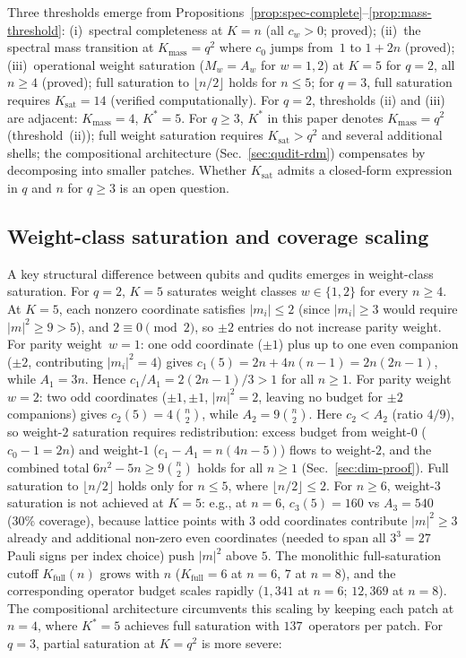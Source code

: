 \documentclass[twocolumn,prx,aps,superscriptaddress,longbibliography]{revtex4-2}
\begin{document}
Three thresholds emerge from
Propositions~\ref{prop:spec-complete}--\ref{prop:mass-threshold}:
(i)~spectral completeness at $K = n$ (all $c_w > 0$; proved);
(ii)~the spectral mass transition at $K_{\mathrm{mass}} = q^2$
where $c_0$ jumps from~$1$ to $1 + 2n$ (proved);
(iii)~operational weight saturation ($M_w = A_w$ for
$w = 1, 2$) at $K = 5$ for $q = 2$, all $n \ge 4$ (proved);
full saturation to $\lfloor n/2 \rfloor$ holds for $n \le 5$;
for $q = 3$, full saturation requires
$K_\mathrm{sat} = 14$ (verified computationally).
For $q = 2$, thresholds (ii) and (iii) are adjacent:
$K_{\mathrm{mass}} = 4$, $K^* = 5$.
For $q \ge 3$, $K^*$ in this paper denotes
$K_{\mathrm{mass}} = q^2$ (threshold~(ii)); full weight saturation
requires $K_{\mathrm{sat}} > q^2$ and several additional shells;
the compositional architecture (Sec.~\ref{sec:qudit-rdm})
compensates by decomposing into smaller patches.
Whether $K_\mathrm{sat}$ admits a closed-form expression in
$q$ and $n$ for $q \ge 3$ is an open question.

\subsection{Weight-class saturation and coverage scaling}
\label{sec:saturation}

A key structural difference between qubits and qudits emerges
in weight-class saturation.  For $q = 2$, $K = 5$ saturates
weight classes $w \in \{1, 2\}$ for every $n \ge 4$.
At $K = 5$, each nonzero coordinate satisfies $|m_i| \le 2$
(since $|m_i| \ge 3$ would require $|m|^2 \ge 9 > 5$),
and $2 \equiv 0 \pmod{2}$, so $\pm 2$ entries do not
increase parity weight.
For parity weight~$w = 1$: one odd coordinate ($\pm 1$)
plus up to one even companion ($\pm 2$, contributing
$|m_i|^2 = 4$) gives
$c_1(5) = 2n + 4n(n{-}1) = 2n(2n{-}1)$, while
$A_1 = 3n$.
Hence $c_1 / A_1 = 2(2n{-}1)/3 > 1$ for all $n \ge 1$.
For parity weight~$w = 2$: two odd coordinates ($\pm 1, \pm 1$,
$|m|^2 = 2$, leaving no budget for $\pm 2$ companions) gives
$c_2(5) = 4\binom{n}{2}$, while $A_2 = 9\binom{n}{2}$.
Here $c_2 < A_2$ (ratio $4/9$), so weight-$2$ saturation
requires redistribution: excess budget from weight-$0$
($c_0 - 1 = 2n$) and weight-$1$ ($c_1 - A_1 = n(4n{-}5)$)
flows to weight-$2$, and the combined total
$6n^2 - 5n \ge 9\binom{n}{2}$ holds for all $n \ge 1$
(Sec.~\ref{sec:dim-proof}).
Full saturation to $\lfloor n/2 \rfloor$ holds only for
$n \le 5$, where $\lfloor n/2 \rfloor \le 2$.
For $n \ge 6$, weight-$3$ saturation is not achieved at $K = 5$:
e.g., at $n = 6$, $c_3(5) = 160$ vs $A_3 = 540$ (30\% coverage),
because lattice points with $3$ odd coordinates contribute
$|m|^2 \ge 3$ already and additional non-zero even coordinates
(needed to span all $3^3 = 27$ Pauli signs per index choice)
push $|m|^2$ above $5$.
The monolithic full-saturation cutoff $K_{\mathrm{full}}(n)$
grows with $n$ ($K_{\mathrm{full}} = 6$ at $n = 6$, $7$ at
$n = 8$), and the corresponding operator budget scales rapidly
($1{,}341$ at $n = 6$; $12{,}369$ at $n = 8$).
The compositional architecture circumvents this scaling by
keeping each patch at $n = 4$, where $K^* = 5$ achieves full
saturation with $137$~operators per patch.
For $q = 3$, partial saturation at $K = q^2$ is more severe:
\end{document}
